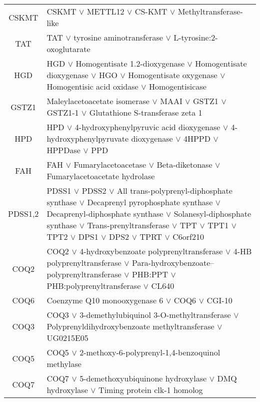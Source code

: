 \documentclass{article}
\begin{document}
\begin{table}[h]
    \centering
    \renewcommand{\arraystretch}{1.2}
    \begin{tabular}{c|p{5in}}
    CSKMT & CSKMT $\vee$ METTL12 $\vee$ CS-KMT $\vee$ Methyltransferase-like \\
    TAT & TAT $\vee$ tyrosine aminotransferase $\vee$ L-tyrosine:2-oxoglutarate \\
    HGD & HGD $\vee$ Homogentisate 1.2-dioxygenase $\vee$ Homogentisate dioxygenase $\vee$ HGO $\vee$ Homogentisate oxygenase $\vee$ Homogentisic acid oxidase $\vee$ Homogentisicase \\
    GSTZ1 & Maleylacetoacetate isomerase $\vee$ MAAI $\vee$ GSTZ1 $\vee$ GSTZ1-1 $\vee$ Glutathione S-transferase zeta 1 \\
    HPD & HPD $\vee$ 4-hydroxyphenylpyruvic acid dioxygenase $\vee$ 4-hydroxyphenylpyruvate dioxygenase $\vee$ 4HPPD $\vee$ HPPDase $\vee$ PPD \\
    FAH & FAH $\vee$ Fumarylacetoacetase $\vee$ Beta-diketonase $\vee$ Fumarylacetoacetate hydrolase \\
    PDSS1,2 & PDSS1 $\vee$ PDSS2 $\vee$ All trans-polyprenyl-diphosphate synthase $\vee$ Decaprenyl pyrophosphate synthase $\vee$ Decaprenyl-diphosphate synthase $\vee$ Solanesyl-diphosphate synthase $\vee$ Trans-prenyltransferase $\vee$ TPT $\vee$ TPT1 $\vee$ TPT2 $\vee$ DPS1 $\vee$ DPS2 $\vee$ TPRT $\vee$ C6orf210 \\
    COQ2 & COQ2 $\vee$ 4-hydroxybenzoate polyprenyltransferase $\vee$ 4-HB polyprenyltransferase $\vee$ Para-hydroxybenzoate--polyprenyltransferase $\vee$ PHB:PPT $\vee$ PHB:polyprenyltransferase $\vee$ CL640 \\
    COQ6 & Coenzyme Q10 monooxygenase 6 $\vee$ COQ6 $\vee$ CGI-10 \\
    COQ3 & COQ3 $\vee$ 3-demethylubiquinol 3-O-methyltransferase $\vee$ Polyprenyldihydroxybenzoate methyltransferase $\vee$ UG0215E05 \\
    COQ5 & COQ5 $\vee$ 2-methoxy-6-polyprenyl-1,4-benzoquinol methylase \\
    COQ7 & COQ7 $\vee$ 5-demethoxyubiquinone hydroxylase $\vee$ DMQ hydroxylase $\vee$ Timing protein clk-1 homolog \\
    \end{tabular}
\end{table}
\end{document}
